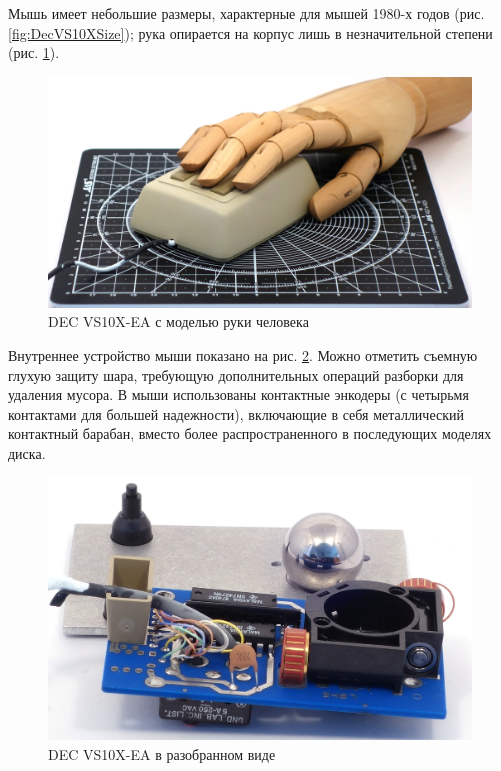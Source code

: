\documentclass[11pt, a4paper]{article}
\begin{document}
Мышь имеет небольшие размеры, характерные для мышей 1980-х годов (рис. \ref{fig:DecVS10XSize}); рука опирается на корпус лишь в незначительной степени (рис. \ref{fig:DecVS10XHand}).

\begin{figure}[h]
    \centering
    \includegraphics[scale=0.7]{1983_dec_vs10x_ea_mouse/hand_30.jpg}
    \caption{DEC VS10X-EA с моделью руки человека}
    \label{fig:DecVS10XHand}
\end{figure}

Внутреннее устройство мыши показано на рис. \ref{fig:DecVS10XInside}. Можно отметить съемную глухую защиту шара, требующую дополнительных операций разборки для удаления мусора. В мыши использованы контактные энкодеры (с четырьмя контактами для большей надежности), включающие в себя металлический контактный барабан, вместо более распространенного в последующих моделях диска.

 \begin{figure}[h]
    \centering
    \includegraphics[scale=1]{1983_dec_vs10x_ea_mouse/inside_30.jpg}
    \caption{DEC VS10X-EA в разобранном виде}
    \label{fig:DecVS10XInside}
\end{figure}
\end{document}
